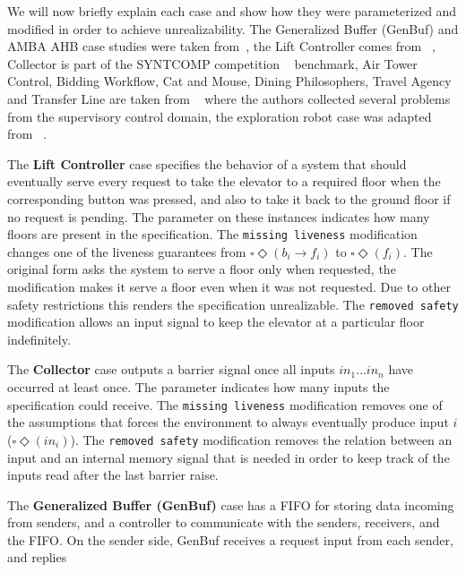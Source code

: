 We will now briefly explain each case and show how they were parameterized and modified in order to achieve unrealizability. 
The Generalized Buffer (GenBuf) and AMBA AHB case studies were taken from~\cite{DBLP:conf/hvc/KonighoferHB10}, the Lift Controller comes from ~\cite{DBLP:conf/fmcad/AlurMT13}, Collector is part of the SYNTCOMP competition ~\cite{SYNTCOMP} benchmark, Air Tower Control, Bidding Workflow, Cat and Mouse, Dining Philosophers, Travel Agency and Transfer Line are taken from ~\cite{ciolek2019compositional} where the authors collected several problems from the supervisory control domain, the exploration robot case was adapted from ~\cite{DBLP:journals/corr/abs-2001-07678}.
\begin{description}[align=left,leftmargin=0.7cm,font=\normalfont,style=nextline,itemsep=0pt]
\item[LC] The \textbf{Lift Controller} case specifies the behavior of a system that should eventually serve every request to take the elevator to a required floor when the corresponding button was pressed, and also to take it back to the ground floor if no request is pending. The parameter on these instances indicates how many floors are present in the specification. The \texttt{missing liveness} modification changes one of the liveness guarantees from $\square \Diamond (b_i \rightarrow f_i)$ to $\square \Diamond (f_i)$. The original form asks the system to serve a floor only when requested, the modification makes it serve a floor even when it was not requested. Due to other safety restrictions this renders the specification unrealizable. The \texttt{removed safety} modification allows an input signal to keep the elevator at a particular floor indefinitely.
\item[CO] The \textbf{Collector} case outputs a barrier signal once all inputs $in_1\ldots in_n$ have occurred at least once. The parameter indicates how many inputs the specification could receive. The \texttt{missing liveness} modification removes one of the assumptions that forces the environment to always eventually produce input $i$ ($\square\Diamond(in_i)$). The \texttt{removed safety} modification removes the relation between an input and an internal memory signal that is needed in order to keep track of the inputs read after the last barrier raise.
\item[GB] The \textbf{Generalized Buffer (GenBuf)} case has a FIFO for storing data incoming from senders, and a
controller to communicate with the senders, receivers, and the
FIFO. On the sender side, GenBuf receives a request input from each sender, and replies

\end{description}
